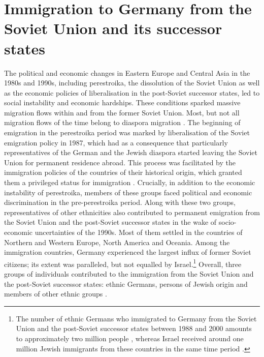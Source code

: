 \section{Immigration to Germany from the Soviet Union and its successor states}\largerpage[1.5]
The political and economic changes in Eastern Europe and Central Asia in the 1980s and 1990s, including perestroika, the dissolution of the Soviet Union as well as the economic policies of liberalisation in the post-Soviet successor states, led to social instability and economic hardships. These conditions sparked massive migration flows within and from the former Soviet Union. Most, but not all migration flows of the time belong to diaspora migration \citep{heleniak03}. The beginning of emigration in the perestroika period was marked by liberalisation of the Soviet emigration policy in 1987, which had as a consequence that particularly representatives of the German and the Jewish diaspora started leaving the Soviet Union for permanent residence abroad. This process was facilitated by the immigration policies of the countries of their historical origin, which granted them a privileged status for immigration \citep[cf.][]{deTinguy}. Crucially, in addition to the economic instability of perestroika, members of these groups faced political and economic discrimination in the pre-perestroika period. Along with these two groups, representatives of other ethnicities also contributed to permanent emigration from the Soviet Union and the post-Soviet successor states in the wake of socio-economic uncertainties of the 1990s. Most of them settled in the countries of Northern and Western Europe, North America and Oceania. Among the immigration countries, Germany experienced the largest influx of former Soviet citizens; its extent was paralleled, but not equalled by Israel.\footnote{The number of ethnic Germans who immigrated to Germany from the Soviet Union and the post-Soviet successor states between 1988 and 2000 amounts to approximately two million people \citep{lederer97}, whereas Israel received around one million Jewish immigrants from these countries in the same time period \citep{tolts}.} Overall, three groups of individuals contributed to the immigration from the Soviet Union and the post-Soviet successor states: ethnic Germans, persons of Jewish origin and members of other ethnic groups \citep[cf.][]{brehmer07}.

